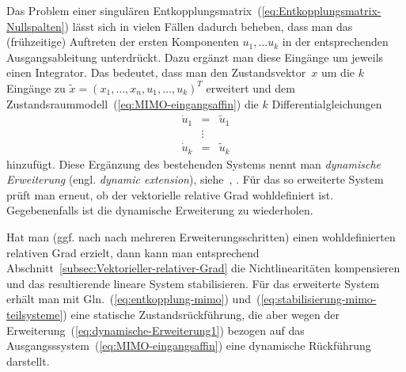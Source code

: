 Das Problem einer singulären Entkopplungsmatrix~(\ref{eq:Entkopplungsmatrix-Nullspalten})
lässt sich in vielen Fällen dadurch beheben, dass man das (frühzeitige)
Auftreten der ersten Komponenten $u_{1},\ldots u_{k}$ in der entsprechenden
Ausgangsableitung unterdrückt. Dazu ergänzt man diese Eingänge um
jeweils einen Integrator. Das bedeutet, dass man den Zustandsvektor~$x$
um die $k$ Eingänge zu $\tilde{x}=(x_{1},\ldots,x_{n},u_{1},\ldots,u_{k})^{T}$
erweitert und dem Zustandsraummodell~(\ref{eq:MIMO-eingangsaffin})
die $k$ Differentialgleichungen
\begin{equation}
\begin{array}{lcl}
\dot{u}_{1} & = & \tilde{u}_{1}\\
 & \vdots\\
\dot{u}_{k} & = & \tilde{u}_{k}
\end{array}\label{eq:dynamische-Erweiterung1}
\end{equation}
hinzufügt. Diese Ergänzung des bestehenden Systems nennt man \emph{dynamische
Erweiterung} (engl. \emph{dynamic extension}),
siehe~\cite[Abschnitt~{5.4}]{isidori3}, \cite[Abschnitt~{6.8}]{kwatny2000}.
Für das so erweiterte System prüft man erneut, ob der vektorielle
relative Grad wohldefiniert ist. Gegebenenfalls ist die dynamische
Erweiterung zu wiederholen. 

Hat man (ggf. nach nach mehreren Erweiterungsschritten) einen wohldefinierten
relativen Grad erzielt, dann kann man entsprechend Abschnitt~\ref{subsec:Vektorieller-relativer-Grad}
die Nichtlinearitäten kompensieren und das resultierende lineare System
stabilisieren. Für das erweiterte System erhält man mit Gln.~(\ref{eq:entkopplung-mimo})
und~(\ref{eq:stabilisierung-mimo-teilsysteme}) eine statische Zustandsrückführung,
die aber wegen der Erweiterung~(\ref{eq:dynamische-Erweiterung1})
bezogen auf das Ausgangsssystem~(\ref{eq:MIMO-eingangsaffin}) eine
dynamische Rückführung darstellt.

